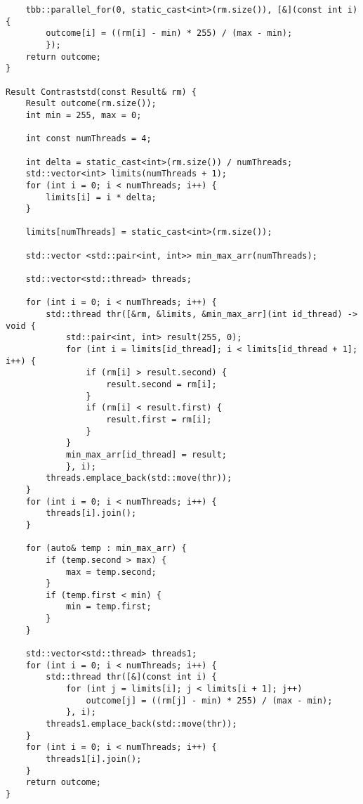 \documentclass{report}
\begin{document}
\begin{lstlisting}
    tbb::parallel_for(0, static_cast<int>(rm.size()), [&](const int i) {
        outcome[i] = ((rm[i] - min) * 255) / (max - min);
        });
    return outcome;
}

Result Contraststd(const Result& rm) {
    Result outcome(rm.size());
    int min = 255, max = 0;

    int const numThreads = 4;

    int delta = static_cast<int>(rm.size()) / numThreads;
    std::vector<int> limits(numThreads + 1);
    for (int i = 0; i < numThreads; i++) {
        limits[i] = i * delta;
    }

    limits[numThreads] = static_cast<int>(rm.size());

    std::vector <std::pair<int, int>> min_max_arr(numThreads);

    std::vector<std::thread> threads;

    for (int i = 0; i < numThreads; i++) {
        std::thread thr([&rm, &limits, &min_max_arr](int id_thread) -> void {
            std::pair<int, int> result(255, 0);
            for (int i = limits[id_thread]; i < limits[id_thread + 1]; i++) {
                if (rm[i] > result.second) {
                    result.second = rm[i];
                }
                if (rm[i] < result.first) {
                    result.first = rm[i];
                }
            }
            min_max_arr[id_thread] = result;
            }, i);
        threads.emplace_back(std::move(thr));
    }
    for (int i = 0; i < numThreads; i++) {
        threads[i].join();
    }

    for (auto& temp : min_max_arr) {
        if (temp.second > max) {
            max = temp.second;
        }
        if (temp.first < min) {
            min = temp.first;
        }
    }

    std::vector<std::thread> threads1;
    for (int i = 0; i < numThreads; i++) {
        std::thread thr([&](const int i) {
            for (int j = limits[i]; j < limits[i + 1]; j++)
                outcome[j] = ((rm[j] - min) * 255) / (max - min);
            }, i);
        threads1.emplace_back(std::move(thr));
    }
    for (int i = 0; i < numThreads; i++) {
        threads1[i].join();
    }
    return outcome;
}
\end{lstlisting}
\end{document}
